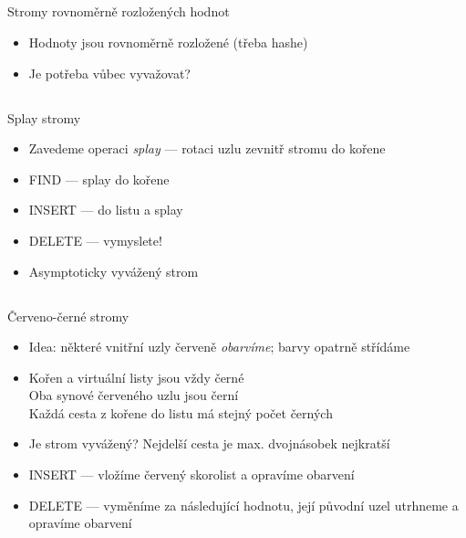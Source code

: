 \documentclass{beamer}
\begin{document}
\subsection{}
\begin{frame}{Stromy rovnoměrně rozložených hodnot}
\begin{itemize}
\item Hodnoty jsou rovnoměrně rozložené (třeba hashe)
\item Je potřeba vůbec vyvažovat?
\end{itemize}
\end{frame}

\subsection{}
\begin{frame}{Splay stromy}
\begin{itemize}
\item Zavedeme operaci {\em splay} --- rotaci uzlu zevnitř stromu do kořene
\item FIND --- splay do kořene
\item INSERT --- do listu a splay
\item DELETE --- vymyslete!
\item Asymptoticky vyvážený strom
\end{itemize}
\end{frame}

\subsection{}
\begin{frame}{Červeno-černé stromy}
\begin{itemize}
\item Idea: některé vnitřní uzly červeně {\em obarvíme}; barvy opatrně střídáme
\item Kořen a virtuální listy jsou vždy černé \\
	Oba synové červeného uzlu jsou černí \\
	Každá cesta z kořene do listu má stejný počet černých
\item Je strom vyvážený? \pause Nejdelší cesta je max. dvojnásobek nejkratší
\item INSERT --- vložíme červený skorolist a opravíme obarvení
\item DELETE --- vyměníme za následující hodnotu, její původní uzel utrhneme a opravíme obarvení
\end{itemize}
\end{frame}
\end{document}
